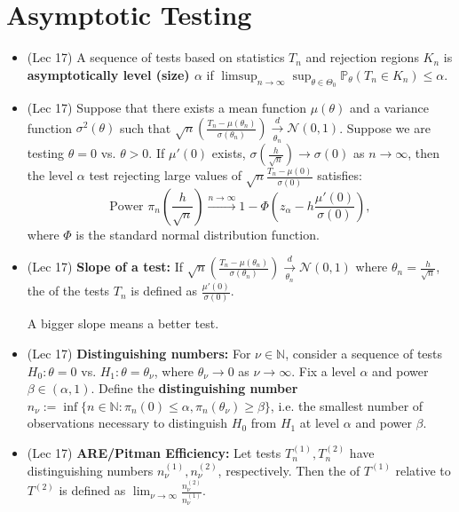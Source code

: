 \documentclass[twoside]{article}
\newcommand{\dis}{\displaystyle}
\newcommand\bbP{\mathbb{P}}
\newcommand\sg{\sigma}
\def\t{\theta}
\newcommand\T{\Theta}
\newcommand\goesto{\rightarrow}
\begin{document}
\section{Asymptotic Testing}
\begin{itemize}
\item (Lec 17) A sequence of tests based on statistics $T_n$ and rejection regions $K_n$ is \textbf{asymptotically level (size) $\alpha$} if $\dis\limsup_{n \to \infty} \sup_{\t \in \T_0}  \bbP_{\t}(T_n \in K_n) \leq \alpha$.

\item (Lec 17) Suppose that there exists a mean function $\mu(\theta)$ and a variance function $\sigma^2(\theta)$ such that $ \sqrt{n}\left(\dis\frac{T_n - \mu(\theta_n)}{\sigma(\theta_n)} \right) \xrightarrow[\theta_n]{d} \mathcal{N}(0,1)$. Suppose we are testing $\t = 0$ vs. $\t > 0$. If $\mu'(0)$ exists, $\sg\left(\frac{h}{\sqrt{n}}\right) \to \sg(0)$ as $n \goesto \infty$, then the level $\alpha$ test rejecting large values of $\sqrt{n}\dis\frac{T_n - \mu(0)}{\sg(0)}$ satisfies:
\[ \text{Power } \pi_n\left(\frac{h}{\sqrt{n}}\right) \xrightarrow{n \to \infty} 1 - \Phi\left(z_{\alpha} - h \frac{\mu'(0)}{\sigma(0)} \right),\]
where $\Phi$ is the standard normal distribution function.

\item (Lec 17) \textbf{Slope of a test:} If $\sqrt{n}\left(\dis\frac{T_n - \mu(\theta_n)}{\sigma(\theta_n)} \right) \xrightarrow[\theta_n]{d} \mathcal{N}(0,1)$ where $\t_n = \dis\frac{h}{\sqrt{n}}$, the  of the tests $T_n$ is defined as $\dis\frac{\mu'(0)}{\sg(0)}$.

A bigger slope means a better test.

\item (Lec 17) \textbf{Distinguishing numbers:} For $\nu \in \mathbb{N}$, consider a sequence of tests $H_0: \t =0$ vs. $H_1: \t = \t_\nu$, where $\t_\nu \goesto 0$ as $\nu \to \infty$. Fix a level $\alpha$ and power $\beta \in (\alpha,1)$. Define the \textbf{distinguishing number} $n_\nu := \inf \{n \in \mathbb{N} : \pi_n (0) \leq \alpha, \pi_n ( \theta_\nu ) \geq \beta \}$, i.e. the smallest number of observations necessary to distinguish $H_0$ from $H_1$ at level $\alpha$ and power $\beta$.

\item (Lec 17) \textbf{ARE/Pitman Efficiency:} Let tests $T_n^{(1)}, T_n^{(2)}$ have distinguishing numbers $n_\nu^{(1)}, n_\nu^{(2)}$, respectively. Then the  of $T^{(1)}$ relative to $T^{(2)}$ is defined as $\dis\lim_{\nu \goesto \infty}\frac{n_\nu^{(2)}}{n_\nu^{(1)}}$.


\end{itemize}
\end{document}
